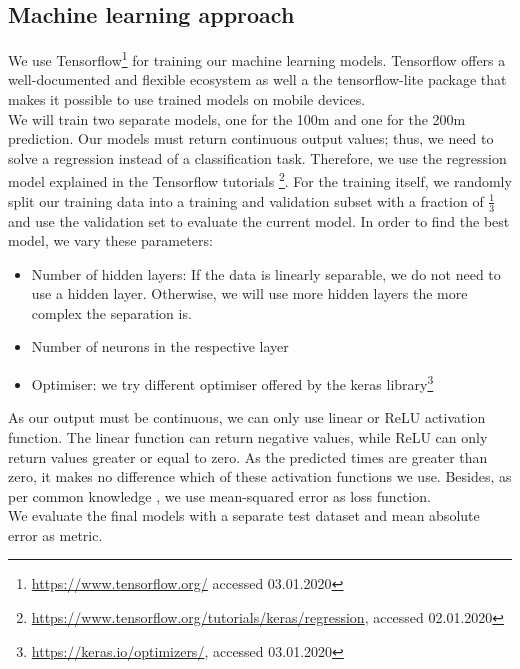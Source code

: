 \subsection{Machine learning approach}
We use Tensorflow\footnote{\url{https://www.tensorflow.org/} accessed 03.01.2020} for training our machine learning models. Tensorflow offers a well-documented and flexible ecosystem as well a the tensorflow-lite package that makes it possible to use trained models on mobile devices.\\
We will train two separate models, one for the 100m and one for the 200m prediction. Our models must return continuous output values; thus, we need to solve a regression instead of a classification task. Therefore, we use the regression model explained in the Tensorflow tutorials \footnote{\url{https://www.tensorflow.org/tutorials/keras/regression}, accessed 02.01.2020}.
For the training itself, we randomly split our training data into a training and validation subset with a fraction of $\frac{1}{3}$ and use the validation set to evaluate the current model. In order to find the best model, we vary these parameters:
\begin{itemize}
    \item Number of hidden layers: If the data is linearly separable, we do not need to use a hidden layer. Otherwise, we will use more hidden layers the more complex the separation is.
    \item Number of neurons in the respective layer
    \item Optimiser: we try different optimiser offered by the keras library\footnote{\url{https://keras.io/optimizers/}, accessed 03.01.2020}
\end{itemize}
As our output must be continuous, we can only use linear or ReLU activation function. The linear function can return negative values, while ReLU can only return values greater or equal to zero. As the predicted times are greater than zero, it makes no difference which of these activation functions we use. Besides, as per common knowledge \cite{Reed.1999}, we use mean-squared error as loss function.\\
We evaluate the final models with a separate test dataset and mean absolute error as metric.
